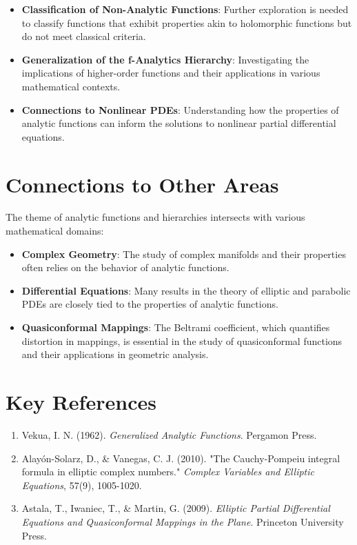 \documentclass[11pt,a4paper]{article}
\begin{document}
\begin{itemize}
\item \textbf{Classification of Non-Analytic Functions}: Further exploration is needed to classify functions that exhibit properties akin to holomorphic functions but do not meet classical criteria.
\item \textbf{Generalization of the f-Analytics Hierarchy}: Investigating the implications of higher-order functions and their applications in various mathematical contexts.
\item \textbf{Connections to Nonlinear PDEs}: Understanding how the properties of analytic functions can inform the solutions to nonlinear partial differential equations.
\end{itemize}

\section{Connections to Other Areas}

The theme of analytic functions and hierarchies intersects with various mathematical domains:

\begin{itemize}
\item \textbf{Complex Geometry}: The study of complex manifolds and their properties often relies on the behavior of analytic functions.
\item \textbf{Differential Equations}: Many results in the theory of elliptic and parabolic PDEs are closely tied to the properties of analytic functions.
\item \textbf{Quasiconformal Mappings}: The Beltrami coefficient, which quantifies distortion in mappings, is essential in the study of quasiconformal functions and their applications in geometric analysis.
\end{itemize}

\section{Key References}

\begin{enumerate}
\item Vekua, I. N. (1962). \textit{Generalized Analytic Functions}. Pergamon Press.
\item Alayón-Solarz, D., & Vanegas, C. J. (2010). "The Cauchy-Pompeiu integral formula in elliptic complex numbers." \textit{Complex Variables and Elliptic Equations}, 57(9), 1005-1020.
\item Astala, T., Iwaniec, T., & Martin, G. (2009). \textit{Elliptic Partial Differential Equations and Quasiconformal Mappings in the Plane}. Princeton University Press.
\end{enumerate}
\end{document}
